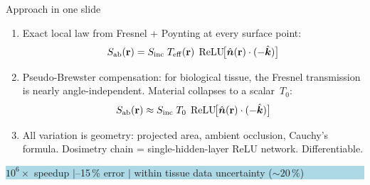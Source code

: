 \begin{frame}{Approach in one slide}

  \begin{enumerate}
    \item Exact local law from Fresnel + Poynting at every surface point:
    \[
      S_{\mathrm{ab}}(\mathbf{r}) = S_{\mathrm{inc}} \;T_{\mathrm{eff}}(\mathbf{r}) \;\operatorname{ReLU}\!\bigl[\hat{\bm{n}}(\mathbf{r})\cdot(-\hat{\bm{k}})\bigr]
    \]

    \item Pseudo-Brewster compensation: for biological tissue,
          the Fresnel transmission is nearly angle-independent.
          Material collapses to a scalar~$T_0$:
    \[
      S_{\mathrm{ab}}(\mathbf{r}) \approx S_{\mathrm{inc}} \; T_0 \;\operatorname{ReLU}\!\bigl[\hat{\bm{n}}(\mathbf{r})\cdot(-\hat{\bm{k}})\bigr]
    \]

    \item All variation is geometry: projected area, ambient occlusion, Cauchy's formula.
          Dosimetry chain = single-hidden-layer ReLU network. Differentiable.
  \end{enumerate}

  \vspace{6pt}
  \begin{center}
    \colorbox{lightblue}{\parbox{0.75\textwidth}{\centering
      $10^6\times$ speedup \quad$\mid$--15\,\% error \quad$\mid$\quad
      within tissue data uncertainty (${\sim}20\,\%$)
    }}
  \end{center}
\end{frame}

